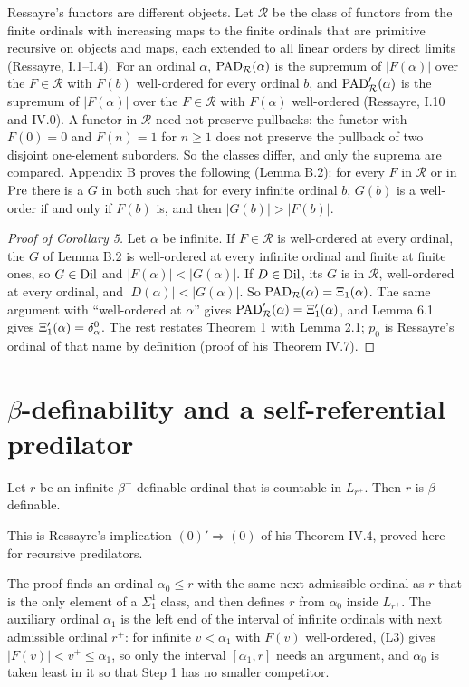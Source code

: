 \documentclass[11pt]{article}
\begin{document}
Ressayre's functors are different objects. Let $\mathcal R$ be the class of functors from the finite ordinals with
increasing maps to the finite ordinals that are primitive recursive on objects and maps, each extended to all
linear orders by direct limits (Ressayre, I.1--I.4). For an ordinal $\alpha$, $\mathrm{PAD}_{\mathcal R}(\alpha)$ is the supremum of
$|F(\alpha)|$ over the $F \in \mathcal R$ with $F(b)$ well-ordered for every ordinal $b$, and $\mathrm{PAD}'_{\mathcal R}(\alpha)$ is the
supremum of $|F(\alpha)|$ over the $F \in \mathcal R$ with $F(\alpha)$ well-ordered (Ressayre, I.10 and IV.0). A functor in
$\mathcal R$ need not preserve pullbacks: the functor with $F(0) = 0$ and $F(n) = 1$ for $n \ge 1$ does not
preserve the pullback of two disjoint one-element suborders. So the classes differ, and only the suprema are
compared. Appendix B proves the following (Lemma B.2): for every $F$ in $\mathcal R$ or in $\mathrm{Pre}$ there is a
$G$ in both such that for every infinite ordinal $b$, $G(b)$ is a well-order if and only if $F(b)$ is, and then
$|G(b)| > |F(b)|$.

\begin{proof}[Proof of Corollary 5] Let $\alpha$ be infinite. If $F \in \mathcal R$ is well-ordered at every
ordinal, the $G$ of Lemma B.2 is well-ordered at every infinite ordinal and finite at finite ones, so $G \in \mathrm{Dil}$
and $|F(\alpha)| < |G(\alpha)|$. If $D \in \mathrm{Dil}$, its $G$ is in $\mathcal R$, well-ordered at every ordinal, and
$|D(\alpha)| < |G(\alpha)|$. So $\mathrm{PAD}_{\mathcal R} (\alpha) = \Xi_1(\alpha)$. The same argument with ``well-ordered at
$\alpha$'' gives $\mathrm{PAD}'_{\mathcal R} (\alpha) = \Xi'_1(\alpha)$, and Lemma 6.1 gives $\Xi'_1(\alpha) = \delta^0_{\alpha}$. The
rest restates Theorem 1 with Lemma 2.1; $p_0$ is Ressayre's ordinal of that name by definition (proof of his Theorem IV.7).
\end{proof}

\section{$\beta$-definability and a self-referential predilator}

\begin{statement} Let $r$ be an infinite $\beta^-$-definable ordinal that is countable in
$L_{r^+}$. Then $r$ is $\beta$-definable.
\end{statement}

This is Ressayre's implication $(0)' \Rightarrow (0)$ of his Theorem IV.4, proved here for recursive predilators.

The proof finds an ordinal $\alpha_0 \le r$ with the same next admissible ordinal as $r$ that is the only element
of a $\Sigma^1_1$ class, and then defines $r$ from $\alpha_0$ inside $L_{r^+}$. The auxiliary ordinal $\alpha_1$ is
the left end of the interval of infinite ordinals with next admissible ordinal $r^+$: for infinite
$v < \alpha_1$ with $F(v)$ well-ordered, (L3) gives $|F(v)| < v^+ \le \alpha_1$, so only the interval $[\alpha_1, r]$ needs an
argument, and $\alpha_0$ is taken least in it so that Step 1 has no smaller competitor.
\end{document}

